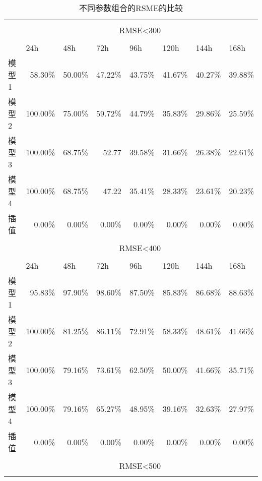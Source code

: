 \begin{table}[htbp]
  \centering
  \caption{不同参数组合的RSME的比较}
    \begin{tabular}{lrrrrrrr}
    \hline\\
          & \multicolumn{7}{c}{RMSE<300} 
          \\\\
          \hline
          & \multicolumn{1}{l}{24h} & \multicolumn{1}{l}{48h} & \multicolumn{1}{l}{72h} & \multicolumn{1}{l}{96h} & \multicolumn{1}{l}{120h} & \multicolumn{1}{l}{144h} & \multicolumn{1}{l}{168h} \\
    模型1   & 58.30\% & 50.00\% & 47.22\% & 43.75\% & 41.67\% & 40.27\% & 39.88\% \\
    模型2   & 100.00\% & 75.00\% & 59.72\% & 44.79\% & 35.83\% & 29.86\% & 25.59\% \\
    模型3   & 100.00\% & 68.75\% & 52.77 & 39.58\% & 31.66\% & 26.38\% & 22.61\% \\
    模型4   & 100.00\% & 68.75\% & 47.22 & 35.41\% & 28.33\% & 23.61\% & 20.23\% \\
    插值    & 0.00\% & 0.00\% & 0.00\% & 0.00\% & 0.00\% & 0.00\% & 0.00\% \\
    \hline
          &       &       &       &       &       &       &  \\
          & \multicolumn{7}{c}{RMSE<400} \\\\
          \hline
          & \multicolumn{1}{l}{24h} & \multicolumn{1}{l}{48h} & \multicolumn{1}{l}{72h} & \multicolumn{1}{l}{96h} & \multicolumn{1}{l}{120h} & \multicolumn{1}{l}{144h} & \multicolumn{1}{l}{168h} \\
    模型1   & 95.83\% & 97.90\% & 98.60\% & 87.50\% & 85.83\% & 86.68\% & 88.63\% \\
    模型2   & 100.00\% & 81.25\% & 86.11\% & 72.91\% & 58.33\% & 48.61\% & 41.66\% \\
    模型3   & 100.00\% & 79.16\% & 73.61\% & 62.50\% & 50.00\% & 41.66\% & 35.71\% \\
    模型4   & 100.00\% & 79.16\% & 65.27\% & 48.95\% & 39.16\% & 32.63\% & 27.97\% \\
    插值    & 0.00\% & 0.00\% & 0.00\% & 0.00\% & 0.00\% & 0.00\% & 0.00\% \\
    \hline
          &       &       &       &       &       &       &  \\
          & \multicolumn{7}{c}{RMSE<500} \\\\

\end{tabular}
\end{table}
